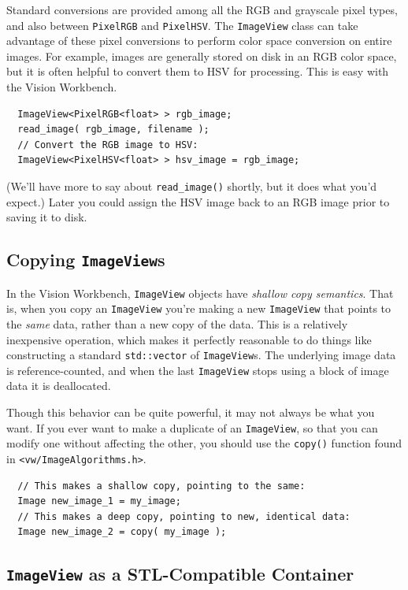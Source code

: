 Standard conversions are provided among all the RGB and grayscale pixel 
types, and also between \verb#PixelRGB# and \verb#PixelHSV#.  The 
\verb#ImageView# class can take advantage of these pixel conversions 
to perform color space conversion on entire images.  For example, 
images are generally stored on disk in an RGB color space, but it is 
often helpful to convert them to HSV for processing.  This is easy  
with the Vision Workbench.
\begin{verbatim}
  ImageView<PixelRGB<float> > rgb_image;
  read_image( rgb_image, filename );
  // Convert the RGB image to HSV:
  ImageView<PixelHSV<float> > hsv_image = rgb_image;
\end{verbatim}
(We'll have more to say about \verb#read_image()# shortly, but it 
does what you'd expect.)  Later you could assign the HSV image back 
to an RGB image prior to saving it to disk.

\subsection{Copying {\tt ImageView}s}

In the Vision Workbench, \verb#ImageView# objects have {\it shallow 
copy semantics}.  That is, when you copy an \verb#ImageView# you're 
making a new \verb#ImageView# that points to the {\it same} data, 
rather than a new copy of the data.  This is a relatively inexpensive 
operation, which makes it perfectly reasonable to do things like 
constructing a standard \verb#std::vector# of \verb#ImageView#s.  The 
underlying image data is reference-counted, and when the last 
\verb#ImageView# stops using a block of image data it is deallocated. 

Though this behavior can be quite powerful, it may not always be 
what you want.  If you ever want to make a duplicate of an 
\verb#ImageView#, so that you can modify one without affecting the 
other, you should use the \verb#copy()# function found in 
\verb#<vw/ImageAlgorithms.h>#.
\begin{verbatim}
  // This makes a shallow copy, pointing to the same:
  Image new_image_1 = my_image;
  // This makes a deep copy, pointing to new, identical data:
  Image new_image_2 = copy( my_image );
\end{verbatim}

\subsection{{\tt ImageView} as a STL-Compatible Container}

